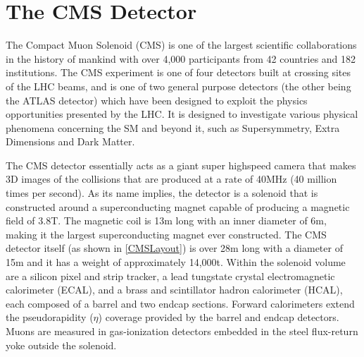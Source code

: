 \chapter{The CMS Detector\label{ch:CMS}}

The Compact Muon Solenoid (CMS) is one of the largest scientific collaborations in the history of mankind with over 4,000 participants from 42 countries and 182 institutions.
The CMS experiment is one of four detectors built at crossing sites of the LHC beams, and is one of two general purpose detectors (the other being the ATLAS detector) which have been designed to exploit the physics opportunities presented by the LHC.
It is designed to investigate various physical phenomena concerning the SM and beyond it, such as Supersymmetry, Extra Dimensions and Dark Matter.

The CMS detector essentially acts as a giant super highspeed camera that makes 3D images of the collisions that are produced at a rate of 40\unit{MHz} (40 million times per second).
As its name implies, the detector is a solenoid that is constructed around a superconducting magnet capable of producing a magnetic field of 3.8\unit{\tesla}.
The magnetic coil is 13\unit{m} long with an inner diameter of 6\unit{m}, making it the largest superconducting magnet ever constructed.
The CMS detector itself  (as shown in \autoref{CMSLayout}) is over 28\unit{m} long with a diameter of 15\unit{m} and it has a weight of approximately 14,000\unit{\tonne}.
Within the solenoid volume are a silicon pixel and strip tracker, a lead tungstate crystal electromagnetic calorimeter (ECAL), and a brass and scintillator hadron calorimeter (HCAL), each composed of a barrel and two endcap sections. Forward calorimeters extend the pseudorapidity ($\eta$) coverage provided by the barrel and endcap detectors. Muons are measured in gas-ionization detectors embedded in the steel flux-return yoke outside the solenoid.



